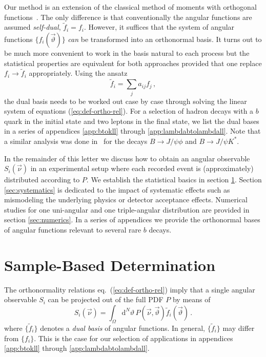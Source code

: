 \documentclass[aps,prd,reprint,nofootinbib,preprintnumbers]{revtex4}
\newcommand{\dual}[1]{\tilde{#1}}
\newcommand{\nuvec}{\vec{\nu}}
\newcommand{\refeq}[1]{eq.~(\ref{eq:#1})}
\newcommand{\rmdx}[1]{\mbox{d} #1 \,} %
\newcommand{\thvec}{\vec{\vartheta}}
\renewcommand{\theta}{\vartheta}
\newcommand{\citeneeded}{{\color{red}\bf [cite needed]}}
\begin{document}
Our method is an extension of the classical method of moments with
orthogonal functions~\cite[sec. 8.2]{James:2006zz}. The only difference
is that conventionally the angular functions are assumed
\emph{self-dual}, $\dual{f}_i = f_i$. However, it suffices that the
system of angular functions $\{f_i(\thvec)\}$ \emph{can} be transformed into
an orthonormal basis. It turns out to be much more convenient to work
in the basis natural to each process but the statistical properties
are equivalent for both approaches provided that one replace $f_i \to
\dual{f}_i$ appropriately. Using the ansatz
\begin{equation}
  \label{eq:dual-ansatz}
  \dual{f}_i = \sum_{j} a_{ij} f_j \,,
\end{equation}
the dual basis needs to be worked out case by case through solving the
linear system of equations (\ref{eq:def-ortho-rel}). For a selection
of hadron decays with a $b$ quark in the initial state and two leptons
in the final state, we list the dual bases in a series of appendices
\ref{app:btokll} through \ref{app:lambdabtolambdall}. Note that a
similar analysis was done in~\cite{Dighe:1998vk} for the decays $B \to
J/\psi \phi$ and $B \to J/\psi K^{*}$.

In the remainder of this letter we discuss how to obtain an angular
observable $S_i(\nuvec)$ in an experimental setup where each recorded
event is (approximately) distributed according to $P$.  We establish
the statistical basics in section \ref{sec:sample-based-det}. Section
\ref{sec:systematics} is dedicated to the impact of systematic effects
such as mismodeling the underlying physics or detector acceptance
effects. Numerical studies for one uni-angular and one triple-angular
distribution are provided in section \ref{sec:numerics}. In a series
of appendices we provide the orthonormal bases of angular functions
relevant to several rare $b$ decays.



\section{Sample-Based Determination}
\label{sec:sample-based-det}

The orthonormality relations \refeq{def-ortho-rel} imply that a single angular observable $S_i$
can be projected out of the full PDF $P$ by means of
\begin{equation}
    \label{eq:det-Pi-analytical}
    S_i(\nuvec) = \int_{\Omega} \rmdx{^N \theta}  P(\nuvec, \thvec) \dual{f}_i(\thvec)\,.
\end{equation}
where $\lbrace \dual{f}_i \rbrace$ denotes a \emph{dual basis} of angular functions. In general, $\lbrace \dual{f}_i \rbrace$ may differ from $\lbrace f_i \rbrace$. This is the
case for our selection of applications in appendices \ref{app:btokll} through \ref{app:lambdabtolambdall}.\\
\end{document}
